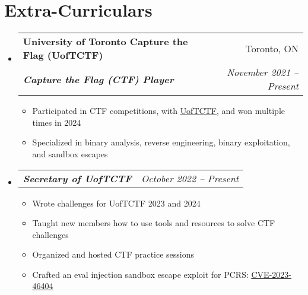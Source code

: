 \documentclass[letterpaper,11pt]{article}
\makeatletter
\newcommand{\resumeItem}[1]{
  \item\small{
    {#1 \vspace{-2pt}}
  }
}
\newcommand{\resumeSubheading}[4]{
  \vspace{-2pt}\item
    \begin{tabular*}{0.97\textwidth}[t]{l@{\extracolsep{\fill}}r}
      \textbf{#1} & #2 \\
      \textit{\small#3} & \textit{\small #4} \\
    \end{tabular*}\vspace{-7pt}
}
\newcommand{\resumeSubSubheading}[2]{
    \item
    \begin{tabular*}{0.97\textwidth}{l@{\extracolsep{\fill}}r}
      \textit{\small#1} & \textit{\small #2} \\
    \end{tabular*}\vspace{-7pt}
}
\newcommand{\resumeSubHeadingListStart}{\begin{itemize}[leftmargin=0.15in, label={}]}
\newcommand{\resumeSubHeadingListEnd}{\end{itemize}}
\newcommand{\resumeItemListStart}{\begin{itemize}}
\newcommand{\resumeItemListEnd}{\end{itemize}\vspace{-5pt}}
\makeatother
\begin{document}
\section{Extra-Curriculars}
  \resumeSubHeadingListStart
    \resumeSubheading
      {University of Toronto Capture the Flag (UofTCTF)}{Toronto, ON}
      {\bf{Capture the Flag (CTF) Player}}{November 2021 -- Present}
      \resumeItemListStart
        \resumeItem{Participated in CTF competitions, with \href{https://ctftime.org/team/139261/}{\underline{UofTCTF}}, and won multiple times in 2024}
        \resumeItem{Specialized in binary analysis, reverse engineering, binary exploitation, and sandbox escapes}
      \resumeItemListEnd

  \resumeSubSubheading
    {\bf{Secretary of UofTCTF}}{October 2022 -- Present}
    \resumeItemListStart
      \resumeItem{Wrote challenges for UofTCTF 2023 and 2024}
      \resumeItem{Taught new members how to use tools and resources to solve CTF challenges}
      \resumeItem{Organized and hosted CTF practice sessions}
      \resumeItem{Crafted an eval injection sandbox escape exploit for PCRS: \href{https://github.com/windecks/CVE-2023-46404}{\underline{CVE-2023-46404}}}
    \resumeItemListEnd


  \resumeSubHeadingListEnd
\end{document}
